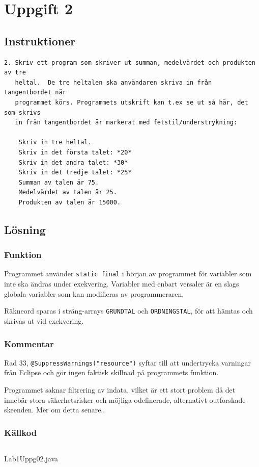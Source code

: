 \section{Uppgift 2}\label{uppgift-2}

\subsection{Instruktioner}
\begin{verbatim}
2. Skriv ett program som skriver ut summan, medelvärdet och produkten av tre
   heltal.  De tre heltalen ska användaren skriva in från tangentbordet när
   programmet körs. Programmets utskrift kan t.ex se ut så här, det som skrivs
   in från tangentbordet är markerat med fetstil/understrykning:

    Skriv in tre heltal.
    Skriv in det första talet: *20*
    Skriv in det andra talet: *30*
    Skriv in det tredje talet: *25*
    Summan av talen är 75.
    Medelvärdet av talen är 25.
    Produkten av talen är 15000.
\end{verbatim}

\subsection{Lösning}
\subsubsection{Funktion}
Programmet använder \texttt{static final} i början av programmet för variabler
som inte ska ändras under exekvering.  Variabler med enbart versaler är en
slags globala variabler som kan modifieras av programmeraren.
\par Räkneord sparas i sträng-arrays \texttt{GRUNDTAL} och
\texttt{ORDNINGSTAL}, för att hämtas och skrivas ut vid exekvering.

\subsubsection{Kommentar}
\par Rad 33, \texttt{@SuppressWarnings("resource")} syftar till att undertrycka
varningar från Eclipse och gör ingen faktisk skillnad på programmets funktion.
\par Programmet saknar filtrering av indata, vilket är ett stort problem då det
innebär stora säkerhetsrisker och möjliga odefinerade, alternativt outforskade
skeenden. Mer om detta senare..

\subsubsection{Källkod}\label{uppgift-2_src}
    \inputminted[linenos]{java}{src/Lab1Uppg02.java}
    \caption{Lab1Uppg02.java}
    \label{Uppg2src}

